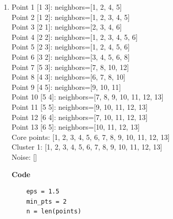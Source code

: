 \documentclass[12pt]{article}
\begin{document}
\begin{enumerate}[label=(\alph*)]
\begin{lstlisting}
        print(f"Point {i+1:2d} {points[i]}: d(m1)={distances[i,0]:.4f}, d(m2)={distances[i,1]:.4f} -> Cluster {assignments[i]+1}")

    # Centroid update
    new_centroids = np.zeros_like(centroids, dtype=float)
    print("\n--- Update Step ---")
    for j in range(len(centroids)):
        cluster_points = points[assignments == j]
        if len(cluster_points) > 0:
            new_centroids[j] = np.mean(cluster_points, axis=0)
        else:
            new_centroids[j] = centroids[j]
            
        print(f"New Centroid {j+1}: {new_centroids[j]}")

    \end{lstlisting}


    \newpage

    \item

    Point  1 [1 3]: neighbors=[1, 2, 4, 5] \\
    Point  2 [1 2]: neighbors=[1, 2, 3, 4, 5] \\
    Point  3 [2 1]: neighbors=[2, 3, 4, 6] \\
    Point  4 [2 2]: neighbors=[1, 2, 3, 4, 5, 6] \\
    Point  5 [2 3]: neighbors=[1, 2, 4, 5, 6] \\
    Point  6 [3 2]: neighbors=[3, 4, 5, 6, 8] \\
    Point  7 [5 3]: neighbors=[7, 8, 10, 12] \\
    Point  8 [4 3]: neighbors=[6, 7, 8, 10] \\
    Point  9 [4 5]: neighbors=[9, 10, 11] \\
    Point 10 [5 4]: neighbors=[7, 8, 9, 10, 11, 12, 13] \\
    Point 11 [5 5]: neighbors=[9, 10, 11, 12, 13] \\
    Point 12 [6 4]: neighbors=[7, 10, 11, 12, 13] \\
    Point 13 [6 5]: neighbors=[10, 11, 12, 13] \\

    Core points: [1, 2, 3, 4, 5, 6, 7, 8, 9, 10, 11, 12, 13] \\
    Cluster 1: [1, 2, 3, 4, 5, 6, 7, 8, 9, 10, 11, 12, 13] \\
    Noise: []

    \textbf{Code}

    \begin{lstlisting}
    eps = 1.5
    min_pts = 2
    n = len(points)


\end{lstlisting}
\end{enumerate}
\end{document}
